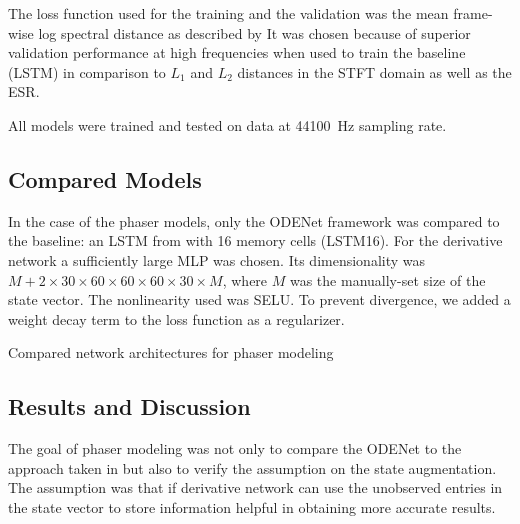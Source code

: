 The loss function used for the training and the validation was the mean frame-wise log spectral distance as described by 
It was chosen because of superior validation performance at high frequencies when used to train the baseline (\ac{LSTM}) in comparison to $L_1$ and $L_2$ distances in the \ac{STFT} domain as well as the \ac{ESR}.

All models were trained and tested on data at \SI{44100}{Hz} sampling rate.

\subsection{Compared Models}
\label{sec:phaser_models}

In the case of the phaser models, only the ODENet framework was compared to the baseline: an \ac{LSTM} from \cite{Wright2020} with 16 memory cells (\ac{LSTM}16). For the derivative network a sufficiently large \ac{MLP} was chosen. Its dimensionality was $M + 2 \times 30 \times 60 \times 60\times 60 \times 30\times M$, where $M$ was the manually-set size of the state vector. The nonlinearity used was \ac{SELU}. To prevent divergence, we added a weight decay term to the loss function as a regularizer.

\begin{table}[]
    \caption{Compared network architectures for phaser modeling}
    \centering
    
    \label{tab:phaser_models_data}
\end{table}

\subsection{Results and Discussion}
\label{sec:phaser_results}

The goal of phaser modeling was not only to compare the ODENet to the approach taken in \cite{Wright2020} but also to verify the assumption on the state augmentation. The assumption was that if derivative network can use the unobserved entries in the state vector to store information helpful in obtaining more accurate results.


